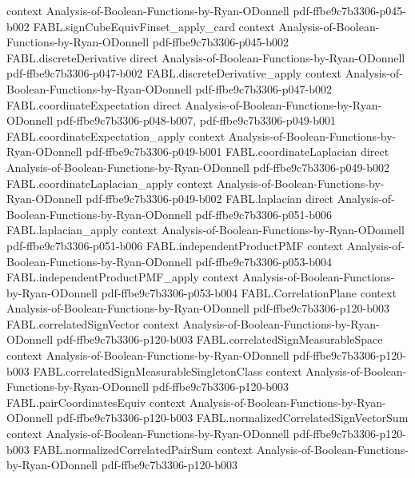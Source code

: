 \begin{theorem}
  {context}
  {Analysis-of-Boolean-Functions-by-Ryan-ODonnell}
  {pdf-ffbe9c7b3306-p045-b002}
\proofstep
  {FABL.signCubeEquivFinset_apply_card}
  {context}
  {Analysis-of-Boolean-Functions-by-Ryan-ODonnell}
  {pdf-ffbe9c7b3306-p045-b002}
\proofstep
  {FABL.discreteDerivative}
  {direct}
  {Analysis-of-Boolean-Functions-by-Ryan-ODonnell}
  {pdf-ffbe9c7b3306-p047-b002}
\proofstep
  {FABL.discreteDerivative_apply}
  {context}
  {Analysis-of-Boolean-Functions-by-Ryan-ODonnell}
  {pdf-ffbe9c7b3306-p047-b002}
\proofstep
  {FABL.coordinateExpectation}
  {direct}
  {Analysis-of-Boolean-Functions-by-Ryan-ODonnell}
  {pdf-ffbe9c7b3306-p048-b007,
    pdf-ffbe9c7b3306-p049-b001}
\proofstep
  {FABL.coordinateExpectation_apply}
  {context}
  {Analysis-of-Boolean-Functions-by-Ryan-ODonnell}
  {pdf-ffbe9c7b3306-p049-b001}
\proofstep
  {FABL.coordinateLaplacian}
  {direct}
  {Analysis-of-Boolean-Functions-by-Ryan-ODonnell}
  {pdf-ffbe9c7b3306-p049-b002}
\proofstep
  {FABL.coordinateLaplacian_apply}
  {context}
  {Analysis-of-Boolean-Functions-by-Ryan-ODonnell}
  {pdf-ffbe9c7b3306-p049-b002}
\proofstep
  {FABL.laplacian}
  {direct}
  {Analysis-of-Boolean-Functions-by-Ryan-ODonnell}
  {pdf-ffbe9c7b3306-p051-b006}
\proofstep
  {FABL.laplacian_apply}
  {context}
  {Analysis-of-Boolean-Functions-by-Ryan-ODonnell}
  {pdf-ffbe9c7b3306-p051-b006}
\proofstep
  {FABL.independentProductPMF}
  {context}
  {Analysis-of-Boolean-Functions-by-Ryan-ODonnell}
  {pdf-ffbe9c7b3306-p053-b004}
\proofstep
  {FABL.independentProductPMF_apply}
  {context}
  {Analysis-of-Boolean-Functions-by-Ryan-ODonnell}
  {pdf-ffbe9c7b3306-p053-b004}
\proofstep
  {FABL.CorrelationPlane}
  {context}
  {Analysis-of-Boolean-Functions-by-Ryan-ODonnell}
  {pdf-ffbe9c7b3306-p120-b003}
\proofstep
  {FABL.correlatedSignVector}
  {context}
  {Analysis-of-Boolean-Functions-by-Ryan-ODonnell}
  {pdf-ffbe9c7b3306-p120-b003}
\proofstep
  {FABL.correlatedSignMeasurableSpace}
  {context}
  {Analysis-of-Boolean-Functions-by-Ryan-ODonnell}
  {pdf-ffbe9c7b3306-p120-b003}
\proofstep
  {FABL.correlatedSignMeasurableSingletonClass}
  {context}
  {Analysis-of-Boolean-Functions-by-Ryan-ODonnell}
  {pdf-ffbe9c7b3306-p120-b003}
\proofstep
  {FABL.pairCoordinatesEquiv}
  {context}
  {Analysis-of-Boolean-Functions-by-Ryan-ODonnell}
  {pdf-ffbe9c7b3306-p120-b003}
\proofstep
  {FABL.normalizedCorrelatedSignVectorSum}
  {context}
  {Analysis-of-Boolean-Functions-by-Ryan-ODonnell}
  {pdf-ffbe9c7b3306-p120-b003}
\proofstep
  {FABL.normalizedCorrelatedPairSum}
  {context}
  {Analysis-of-Boolean-Functions-by-Ryan-ODonnell}
  {pdf-ffbe9c7b3306-p120-b003}

\end{theorem}
